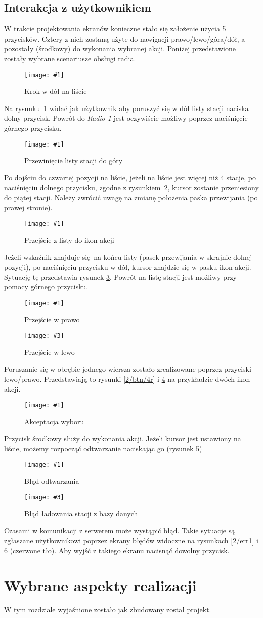 \documentclass[12pt]{report}
\newcommand{\imgint}[4]{
	\begin{figure}[{#4}]
		\centering
		\texttt{[image: \#1]}
		\caption{#2}
		\label{#1}
	\end{figure}
}
\newcommand{\imgh}[3]{\imgint{#1}{#2}{#3}{H}}
\newcommand{\imgintss}[5]{
	\begin{figure}[{#5}]
		\centering
		\begin{minipage}{.45\textwidth}
			\centering
			\texttt{[image: \#1]}
			\caption{#2}
			\label{#1}
		\end{minipage}%
		\hfill
		\begin{minipage}{.45\textwidth}
			\centering
			\texttt{[image: \#3]}
			\caption{#4}
			\label{#3}
		\end{minipage}
	\end{figure}
}
\newcommand{\imghss}[4]{\imgintss{#1}{#2}{#3}{#4}{H}}
\begin{document}
	\section{Interakcja z użytkownikiem}
	W trakcie projektowania ekranów konieczne stało się założenie użycia 5 przycisków. Cztery z nich zostaną użyte do nawigacji prawo/lewo/góra/dół, a pozostały (środkowy) do wykonania wybranej akcji. Poniżej przedstawione zostały wybrane scenariusze obsługi radia.
	
	\imgh{2/btn/1}{Krok w dół na liście}{0.7}
	Na rysunku~\ref{2/btn/1} widać jak użytkownik aby poruszyć się w dół listy stacji naciska dolny przycisk. Powrót do \textit{Radio 1} jest oczywiście możliwy poprzez naciśnięcie górnego przycisku.
	
	\imgh{2/btn/2}{Przewinięcie listy stacji do góry}{0.7}
	Po dojściu do czwartej pozycji na liście, jeżeli na liście jest więcej niż 4 stacje, po naciśnięciu dolnego przycisku, zgodne z rysunkiem~\ref{2/btn/2}, kursor zostanie przeniesiony do piątej stacji. Należy zwrócić uwagę na zmianę położenia paska przewijania (po prawej stronie).
	
	\imgh{2/btn/3}{Przejście z listy do ikon akcji}{0.7}
	Jeżeli wskaźnik znajduje się na końcu listy (pasek przewijania w skrajnie dolnej pozycji), po naciśnięciu przycisku w dół, kursor znajdzie się w pasku ikon akcji. Sytuację tę przedstawia rysunek \ref{2/btn/3}. Powrót na listę stacji jest możliwy przy pomocy górnego przycisku.
	
	\imghss{2/btn/4r}{Przejście w prawo}{2/btn/4l}{Przejście w lewo}
	Poruszanie się w obrębie jednego wiersza zostało zrealizowane poprzez przyciski \mbox{lewo/prawo}. Przedstawiają to rysunki \ref{2/btn/4r} i \ref{2/btn/4l} na przykładzie dwóch ikon akcji.
	
	\imgh{2/btn/5}{Akceptacja wyboru}{0.7}
	Przycisk środkowy służy do wykonania akcji. Jeżeli kursor jest ustawiony na liście, możemy rozpocząć odtwarzanie naciskając go (rysunek \ref{2/btn/5})
	
	\imghss{2/err1}{Błąd odtwarzania}{2/err2}{Błąd ładowania stacji z bazy danych}
	Czasami w komunikacji z serwerem może wystąpić błąd. Takie sytuacje są zgłaszane użytkownikowi poprzez ekrany błędów widoczne na rysunkach \ref{2/err1} i \ref{2/err2} (czerwone tło). Aby wyjść z takiego ekranu nacisnąć dowolny przycisk.

\chapter{Wybrane aspekty realizacji}
	W tym rozdziale wyjaśnione zostało jak zbudowany został projekt.
	
\end{document}
